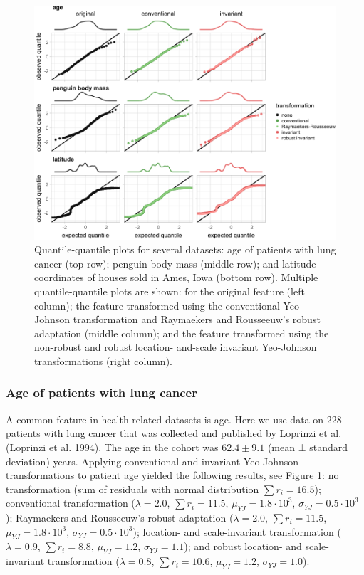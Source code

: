 \documentclass[
  a4paper,
]{article}
\begin{document}
\begin{figure}

{\centering \includegraphics{manuscript_files/figure-latex/experimental-results-invariance-1} 

}

\caption{Quantile-quantile plots for several datasets: age of patients with lung cancer (top row); penguin body mass (middle row); and latitude coordinates of houses sold in Ames, Iowa (bottom row). Multiple quantile-quantile plots are shown: for the original feature (left column); the feature transformed using the conventional Yeo-Johnson transformation and Raymaekers and Rousseeuw's robust adaptation (middle column); and the feature transformed using the non-robust and robust location- and-scale invariant Yeo-Johnson transformations (right column).}\label{fig:experimental-results-invariance}
\end{figure}

\subsubsection{Age of patients with lung
cancer}\label{age-of-patients-with-lung-cancer}

A common feature in health-related datasets is age. Here we use data on
228 patients with lung cancer that was collected and published by
Loprinzi et al. (Loprinzi et al. 1994). The age in the cohort was
\(62.4 \pm 9.1\) (mean ± standard deviation) years. Applying
conventional and invariant Yeo-Johnson transformations to patient age
yielded the following results, see Figure
\ref{fig:experimental-results-invariance}: no transformation (sum of
residuals with normal distribution \(\sum r_i = 16.5\)); conventional
transformation (\(\lambda = 2.0\), \(\sum r_i = 11.5\),
\(\mu_{YJ} = 1.8 \cdot 10^3\), \(\sigma_{YJ} = 0.5 \cdot 10^3\));
Raymaekers and Rousseeuw's robust adaptation (\(\lambda = 2.0\),
\(\sum r_i = 11.5\), \(\mu_{YJ} = 1.8 \cdot 10^3\),
\(\sigma_{YJ} = 0.5 \cdot 10^3\)); location- and scale-invariant
transformation (\(\lambda = 0.9\), \(\sum r_i = 8.8\),
\(\mu_{YJ} = 1.2\), \(\sigma_{YJ} = 1.1\)); and robust location- and
scale-invariant transformation (\(\lambda = 0.8\), \(\sum r_i = 10.6\),
\(\mu_{YJ} = 1.2\), \(\sigma_{YJ} = 1.0\)).
\end{document}
